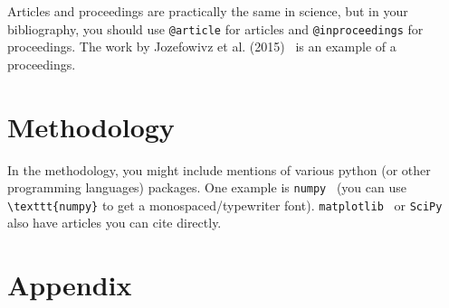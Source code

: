 \documentclass[a4paper,11pt,masters,en,listoffigures,listoftables]{NMBU}
\begin{document}
Articles and proceedings are practically the same in science, but in your bibliography, you should use \verb|@article| for articles and \verb|@inproceedings| for proceedings. The work by Jozefowivz et al. (2015)~\cite{Jozefowicz2015empirical} is an example of a proceedings.

\clearpage
\section{Methodology}

In the methodology, you might include mentions of various python (or other programming languages) packages. One example is \texttt{numpy}~\cite{NumPy}  (you can use \verb|\texttt{numpy}| to get a monospaced/typewriter font). \texttt{matplotlib}~\cite{Matplotlib} or \texttt{SciPy}~\cite{SciPy} also have articles you can cite directly.



\clearpage
{} %

\clearpage
\appendices %

\section{Appendix}
\end{document}
